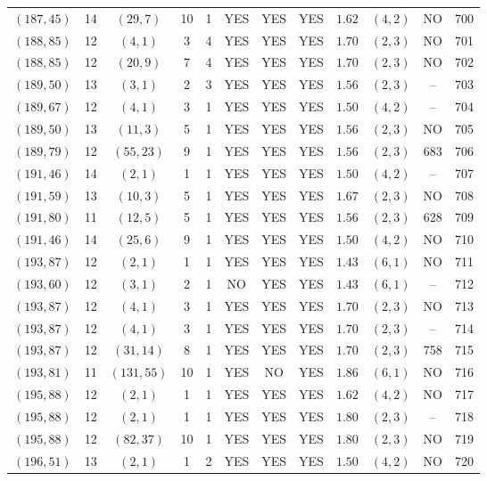 \begin{longtable}{|c|c|c|c|c|c|c|c|c|c|c|c|}
$(187,45)$ & 14 & $(29,7)$ & 10 & 1 & YES & YES & YES & $1.62$ & $(4,2)$ & NO & 700\\
$(188,85)$ & 12 & $(4,1)$ & 3 & 4 & YES & YES & YES & $1.70$ & $(2,3)$ & NO & 701\\
$(188,85)$ & 12 & $(20,9)$ & 7 & 4 & YES & YES & YES & $1.70$ & $(2,3)$ & NO & 702\\
$(189,50)$ & 13 & $(3,1)$ & 2 & 3 & YES & YES & YES & $1.56$ & $(2,3)$ & -- & 703\\
$(189,67)$ & 12 & $(4,1)$ & 3 & 1 & YES & YES & YES & $1.50$ & $(4,2)$ & -- & 704\\
$(189,50)$ & 13 & $(11,3)$ & 5 & 1 & YES & YES & YES & $1.56$ & $(2,3)$ & NO & 705\\
$(189,79)$ & 12 & $(55,23)$ & 9 & 1 & YES & YES & YES & $1.56$ & $(2,3)$ & 683 & 706\\
$(191,46)$ & 14 & $(2,1)$ & 1 & 1 & YES & YES & YES & $1.50$ & $(4,2)$ & -- & 707\\
$(191,59)$ & 13 & $(10,3)$ & 5 & 1 & YES & YES & YES & $1.67$ & $(2,3)$ & NO & 708\\
$(191,80)$ & 11 & $(12,5)$ & 5 & 1 & YES & YES & YES & $1.56$ & $(2,3)$ & 628 & 709\\
$(191,46)$ & 14 & $(25,6)$ & 9 & 1 & YES & YES & YES & $1.50$ & $(4,2)$ & NO & 710\\
$(193,87)$ & 12 & $(2,1)$ & 1 & 1 & YES & YES & YES & $1.43$ & $(6,1)$ & NO & 711\\
$(193,60)$ & 12 & $(3,1)$ & 2 & 1 & NO & YES & YES & $1.43$ & $(6,1)$ & -- & 712\\
$(193,87)$ & 12 & $(4,1)$ & 3 & 1 & YES & YES & YES & $1.70$ & $(2,3)$ & NO & 713\\
$(193,87)$ & 12 & $(4,1)$ & 3 & 1 & YES & YES & YES & $1.70$ & $(2,3)$ & -- & 714\\
$(193,87)$ & 12 & $(31,14)$ & 8 & 1 & YES & YES & YES & $1.70$ & $(2,3)$ & 758 & 715\\
$(193,81)$ & 11 & $(131,55)$ & 10 & 1 & YES & NO & YES & $1.86$ & $(6,1)$ & NO & 716\\
$(195,88)$ & 12 & $(2,1)$ & 1 & 1 & YES & YES & YES & $1.62$ & $(4,2)$ & NO & 717\\
$(195,88)$ & 12 & $(2,1)$ & 1 & 1 & YES & YES & YES & $1.80$ & $(2,3)$ & -- & 718\\
$(195,88)$ & 12 & $(82,37)$ & 10 & 1 & YES & YES & YES & $1.80$ & $(2,3)$ & NO & 719\\
$(196,51)$ & 13 & $(2,1)$ & 1 & 2 & YES & YES & YES & $1.50$ & $(4,2)$ & NO & 720\\

\end{longtable}
